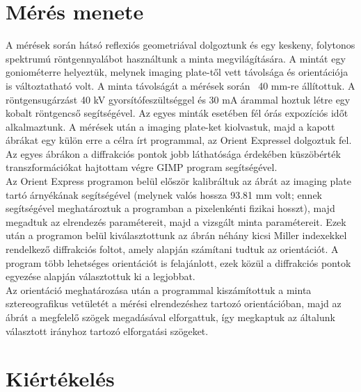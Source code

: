 \documentclass[12pt,a4paper]{article}
\begin{document}
\section{Mérés menete}
\hspace*{10pt} A mérések során hátsó reflexiós geometriával dolgoztunk és egy keskeny, folytonos spektrumú röntgennyalábot használtunk a minta megvilágítására. A mintát egy goniométerre helyeztük, melynek imaging plate-től vett távolsága és orientációja is változtatható volt. A minta távolságát a mérések során ~40 mm-re állítottuk. A röntgensugárzást 40 kV gyorsítófeszültséggel és 30 mA árammal hoztuk létre egy kobalt röntgencső segítségével. Az egyes minták esetében fél órás expozíciós időt alkalmaztunk. A mérések után a imaging plate-ket kiolvastuk, majd a kapott ábrákat egy külön erre a célra írt programmal, az Orient Expressel dolgoztuk fel. Az egyes ábrákon a diffrakciós pontok jobb láthatósága érdekében küszöbérték transzformációkat hajtottam végre GIMP program segítségével.\\
\hspace*{10pt} Az Orient Express programon belül először kalibráltuk az ábrát az imaging plate tartó árnyékának segítségével (melynek valós hossza 93.81 mm volt; ennek segítségével meghatároztuk a programban a pixelenkénti fizikai hosszt), majd megadtuk az elrendezés paramétereit, majd a vizsgált minta paramétereit. Ezek után a programon belül kiválasztottunk az ábrán néhány kicsi Miller indexekkel rendelkező diffrakciós foltot, amely alapján számítani tudtuk az orientációt. A program több lehetséges orientációt is felajánlott, ezek közül a diffrakciós pontok egyezése alapján választottuk ki a legjobbat.\\
\hspace*{10pt} Az orientáció meghatározása után a programmal kiszámítottuk a minta sztereografikus vetületét a mérési elrendezéshez tartozó orientációban, majd az ábrát a megfelelő szögek megadásával elforgattuk, így megkaptuk az általunk választott irányhoz tartozó elforgatási szögeket.

\section{Kiértékelés}
\end{document}

